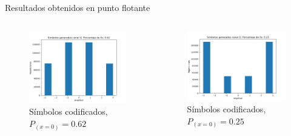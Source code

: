 \documentclass[xcolor=table]{beamer}
\begin{document}
\begin{frame}{Resultados obtenidos en punto flotante}
\begin{columns}

    \begin{column}{0.48\paperwidth}
    \begin{figure}
        \centering
        \includegraphics[width=\textwidth]{Graficos/coded_symbols_5.png}
        \caption{Símbolos codificados, $P_{(x=0)}=0.62$}
        \label{fig:my_label}
    \end{figure}
    
    \end{column}
    \begin{column}{0.51\paperwidth}  
    \begin{figure}
        \centering
        \includegraphics[width=\textwidth]{Graficos/coded_symbols_2.png}
        \caption{Símbolos codificados, $P_{(x=0)}=0.25$}
        \label{fig:my_label}
    \end{figure}

    \end{column}
\end{columns}
\end{frame}
\end{document}
